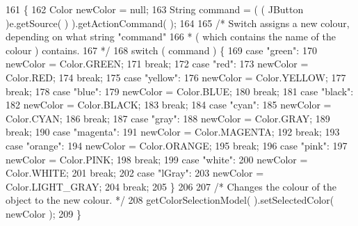 \begin{DoxyCode}
161                                                  \{
162         Color newColor = null;
163         String command = ( ( JButton )e.getSource( ) ).getActionCommand( );
164         
165         \textcolor{comment}{/* Switch assigns a new colour, depending on what string "command"
}
166 \textcolor{comment}{         * ( which contains the name of the colour ) contains. 
}
167 \textcolor{comment}{         */}       
168         \textcolor{keywordflow}{switch} ( command ) \{
169             \textcolor{keywordflow}{case} \textcolor{stringliteral}{"green"}:
170                 newColor = Color.GREEN;
171                 \textcolor{keywordflow}{break};
172             \textcolor{keywordflow}{case} \textcolor{stringliteral}{"red"}:
173                 newColor = Color.RED;
174                 \textcolor{keywordflow}{break};
175             \textcolor{keywordflow}{case} \textcolor{stringliteral}{"yellow"}:
176                 newColor = Color.YELLOW;
177                 \textcolor{keywordflow}{break};
178             \textcolor{keywordflow}{case} \textcolor{stringliteral}{"blue"}:
179                 newColor = Color.BLUE;
180                 \textcolor{keywordflow}{break};
181             \textcolor{keywordflow}{case} \textcolor{stringliteral}{"black"}:
182                 newColor = Color.BLACK;
183                 \textcolor{keywordflow}{break};
184             \textcolor{keywordflow}{case} \textcolor{stringliteral}{"cyan"}:
185                 newColor = Color.CYAN;
186                 \textcolor{keywordflow}{break};
187             \textcolor{keywordflow}{case} \textcolor{stringliteral}{"gray"}:
188                 newColor = Color.GRAY;
189                 \textcolor{keywordflow}{break};
190             \textcolor{keywordflow}{case} \textcolor{stringliteral}{"magenta"}:
191                 newColor = Color.MAGENTA;
192                 \textcolor{keywordflow}{break};
193             \textcolor{keywordflow}{case} \textcolor{stringliteral}{"orange"}:
194                 newColor = Color.ORANGE;
195                 \textcolor{keywordflow}{break};
196             \textcolor{keywordflow}{case} \textcolor{stringliteral}{"pink"}:
197                 newColor = Color.PINK;
198                 \textcolor{keywordflow}{break};
199             \textcolor{keywordflow}{case} \textcolor{stringliteral}{"white"}:
200                 newColor = Color.WHITE;
201                 \textcolor{keywordflow}{break};
202             \textcolor{keywordflow}{case} \textcolor{stringliteral}{"lGray"}:
203                 newColor = Color.LIGHT\_GRAY;
204                 \textcolor{keywordflow}{break};
205         \}
206         
207         \textcolor{comment}{/* Changes the colour of the object to the new colour. */}
208         getColorSelectionModel( ).setSelectedColor( newColor );
209     \}
\end{DoxyCode}
